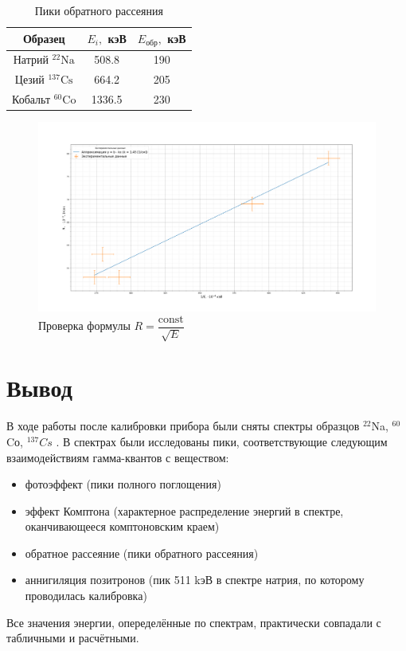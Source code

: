 \documentclass[a4paper,12pt]{article} %
\begin{document}
	\begin{table}[H]
		\caption{Пики обратного рассеяния}
		\begin{center}
			\begin{tabular}{|c|c|c|}
				\hline 
				Образец & $ E_i, $ кэВ  & $ E_{обр}, $ кэВ  \\
				\hline 
				Натрий $ \mathrm{^{22}Na} $  & 508.8 & 190 \\
				Цезий $ \mathrm{^{137}Cs} $ & 664.2 & 205 \\
				Кобальт $ \mathrm{^{60}Co} $ & 1336.5 & 230 \\
				\hline 
			\end{tabular} 
		\end{center}
		\label{obr}
	\end{table}
	\begin{figure}[H]
		\centering
		\includegraphics[width=0.95\linewidth]{R}
		\caption{Проверка формулы $ R = \dfrac{\mathrm{const}}{\sqrt{E}} $}
		\label{fig:r}
	\end{figure}
	\section{Вывод}
	В ходе работы после калибровки прибора были сняты спектры образцов $^{22}$Na,  $^{60}$Cо,  $^{137}Cs$ . В спектрах были исследованы пики, соответствующие следующим взаимодействиям гамма-квантов с веществом:
	\begin{itemize}
		\item фотоэффект (пики полного поглощения)
		\item эффект Комптона (характерное распределение энергий в спектре, оканчивающееся комптоновским краем)
		\item обратное рассеяние (пики обратного рассеяния)
		\item аннигиляция позитронов (пик 511 kэВ в спектре натрия, по которому проводилась калибровка)
	\end{itemize}
	
	Все значения энергии, опеределённые по спектрам, практически совпадали с табличными и расчётными. \par
	
\end{document}
